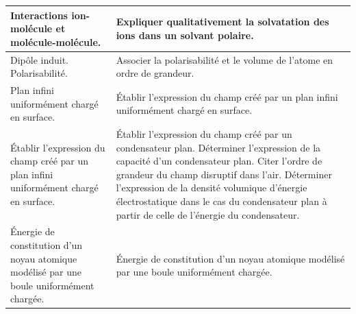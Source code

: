 {\begin{minipage}[t]{0.43\textwidth}
\begin{tabularx}{\linewidth}{|p{}|X|}
        Interactions ion-molécule et molécule-molécule. & Expliquer qualitativement la solvatation des ions dans un solvant polaire. \\
        \hline 
        Dipôle induit. Polarisabilité. & Associer la polarisabilité et le volume de l'atome en ordre de grandeur. \\ 
        \hline
        Plan infini uniformément chargé en surface. & Établir l'expression du champ créé par un plan infini uniformément chargé en surface.\\ 
        \hline
        Établir l'expression du champ créé par un plan infini uniformément chargé en surface. & Établir l'expression du champ créé par un condensateur plan.
        Déterminer l'expression de la capacité d'un condensateur plan.
        Citer l'ordre de grandeur du champ disruptif dans l'air.
        Déterminer l'expression de la densité volumique d'énergie électrostatique dans le cas du condensateur plan à partir de celle de l'énergie du condensateur. \\ 
        \hline
        Énergie de constitution d'un noyau atomique modélisé par une boule uniformément chargée. & Énergie de constitution d'un noyau atomique modélisé par une boule uniformément chargée. \\ 
        \hline
    \end{tabularx}
\end{minipage}
}

